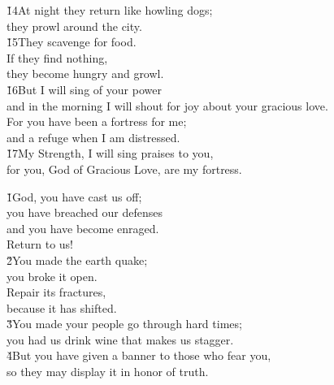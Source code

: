 \begin{poetry}
\poeml \v{14}At night they return like howling dogs; \\
\poemll    they prowl around the city. \\
\poeml \v{15}They scavenge for food. \\
\poemll    If they find nothing, \\
\poemlll       they become hungry and growl. \\
\poeml \v{16}But I will sing of your power \\
\poemll    and in the morning I will shout for joy about your gracious love. \\
\poeml For you have been a fortress for me; \\
\poemll    and a refuge when I am distressed. \\
\poeml \v{17}My Strength, I will sing praises to you, \\
\poemll    for you, God of Gracious Love, are my fortress.
\end{poetry}

\begin{poetry}
\poeml \v{1}God, you have cast us off; \\
\poemll    you have breached our defenses \\
\poeml and you have become enraged. \\
\poemll    Return to us! \\
\poeml \v{2}You made the earth quake; \\
\poemll    you broke it open. \\
\poeml Repair its fractures, \\
\poemll    because it has shifted. \\
\poeml \v{3}You made your people go through hard times; \\
\poemll    you had us drink wine that makes us stagger. \\
\poeml \v{4}But you have given a banner to those who fear you, \\
\poemll    so they may display it in honor of truth.
\end{poetry}

